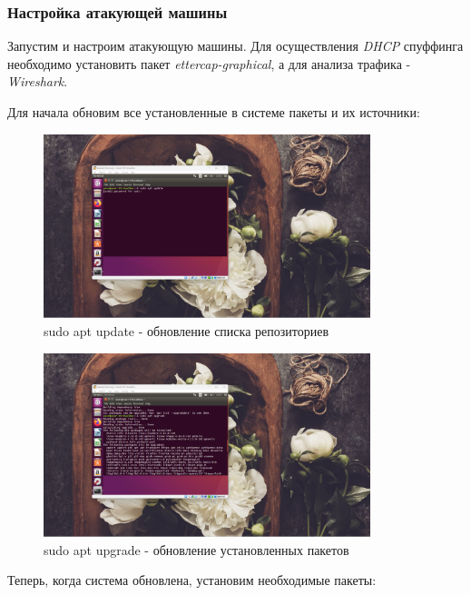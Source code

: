 \documentclass[a4paper]{article}
\begin{document}
  \subsubsection{Настройка атакующей машины}

  Запустим и настроим атакующую машины. Для осуществления \textit{DHCP} спуффинга необходимо
  установить пакет \textit{ettercap-graphical}, а для анализа трафика - \textit{Wireshark}.

  Для начала обновим все установленные в системе пакеты и их источники:

  \begin{figure}[H]
    \centering
    \includegraphics[width=0.85\textwidth]{02_00 (10)}
    \caption{sudo apt update - обновление списка репозиториев}
    \label{img:0009}
  \end{figure}

  \begin{figure}[H]
    \centering
    \includegraphics[width=0.85\textwidth]{02_00 (12)}
    \caption{sudo apt upgrade - обновление установленных пакетов}
    \label{img:0010}
  \end{figure}

  Теперь, когда система обновлена, установим необходимые пакеты:
\end{document}
